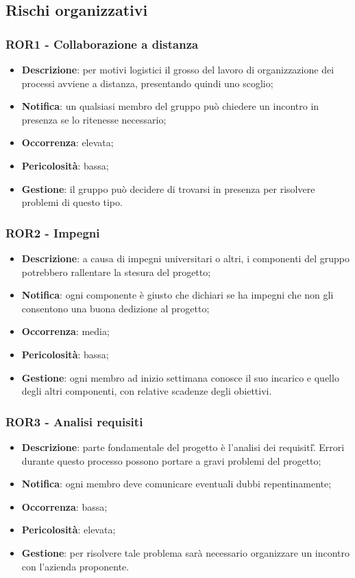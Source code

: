    \subsection{Rischi organizzativi}

	\subsubsection*{ROR1 - Collaborazione a distanza}
	\begin{itemize}
		\item \textbf{Descrizione}: per motivi logistici il grosso del lavoro di organizzazione dei processi avviene a distanza, presentando quindi uno scoglio;
		\item \textbf{Notifica}: un qualsiasi membro del gruppo può chiedere un incontro in presenza se lo ritenesse necessario;
		\item \textbf{Occorrenza}: elevata;
		\item \textbf{Pericolosità}: bassa;
		\item \textbf{Gestione}: il gruppo può decidere di trovarsi in presenza per risolvere problemi di questo tipo.
	\end{itemize}

	\subsubsection*{ROR2 - Impegni}
	\begin{itemize}
		\item \textbf{Descrizione}: a causa di impegni universitari o altri, i componenti del gruppo potrebbero rallentare la stesura del progetto;
		\item \textbf{Notifica}: ogni componente è giusto che dichiari se ha  impegni che non gli consentono una buona dedizione al progetto;
		\item \textbf{Occorrenza}: media;
		\item \textbf{Pericolosità}: bassa;
		\item \textbf{Gestione}: ogni membro ad inizio settimana conosce il suo incarico e quello degli altri componenti, con relative scadenze degli obiettivi.
	\end{itemize}

	\subsubsection*{ROR3 - Analisi requisiti}
	\begin{itemize}
		\item \textbf{Descrizione}: parte fondamentale del progetto è l'analisi dei requisiti\G. Errori durante questo processo possono portare a gravi problemi del progetto;
		\item \textbf{Notifica}: ogni membro deve comunicare eventuali dubbi repentinamente;
		\item \textbf{Occorrenza}: bassa;
		\item \textbf{Pericolosità}: elevata;
		\item \textbf{Gestione}: per risolvere tale problema sarà necessario organizzare un incontro con l'azienda proponente.
	\end{itemize}

